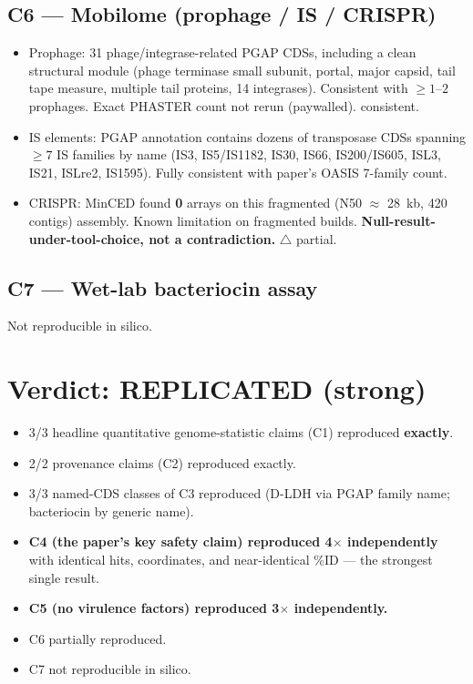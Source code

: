 \documentclass[11pt,letterpaper]{article}
\begin{document}
\subsection*{C6 --- Mobilome (prophage / IS / CRISPR)}
\begin{itemize}[leftmargin=1.2em]
  \item Prophage: 31 phage/integrase-related PGAP CDSs, including a clean structural module (phage terminase small subunit, portal, major capsid, tail tape measure, multiple tail proteins, 14 integrases). Consistent with $\geq 1$--$2$ prophages. Exact PHASTER count not rerun (paywalled). \checkmark consistent.
  \item IS elements: PGAP annotation contains dozens of transposase CDSs spanning $\geq 7$ IS families by name (IS3, IS5/IS1182, IS30, IS66, IS200/IS605, ISL3, IS21, ISLre2, IS1595). Fully consistent with paper's OASIS 7-family count. \checkmark
  \item CRISPR: MinCED found \textbf{0} arrays on this fragmented (N50 $\approx$ 28~kb, 420 contigs) assembly. Known limitation on fragmented builds. \textbf{Null-result-under-tool-choice, not a contradiction.} $\triangle$ partial.
\end{itemize}

\subsection*{C7 --- Wet-lab bacteriocin assay}
Not reproducible in silico.

\section{Verdict: REPLICATED (strong)}
\begin{itemize}[leftmargin=1.2em]
  \item 3/3 headline quantitative genome-statistic claims (C1) reproduced \textbf{exactly}.
  \item 2/2 provenance claims (C2) reproduced exactly.
  \item 3/3 named-CDS classes of C3 reproduced (D-LDH via PGAP family name; bacteriocin by generic name).
  \item \textbf{C4 (the paper's key safety claim) reproduced 4$\times$ independently} with identical hits, coordinates, and near-identical \%ID --- the strongest single result.
  \item \textbf{C5 (no virulence factors) reproduced 3$\times$ independently.}
  \item C6 partially reproduced.
  \item C7 not reproducible in silico.
\end{itemize}
\end{document}
